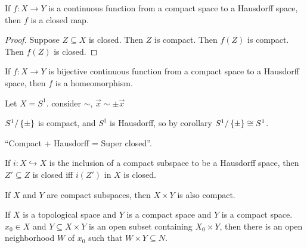 \documentclass[12pt, twosided]{article}
\begin{document}
\begin{cor}
  If \(f:X \to Y\) is a continuous function from a compact space to a Hausdorff space, then \(f\) is a closed map.
\end{cor}

\begin{proof}
  Suppose \(Z \subseteq X\) is closed. Then \(Z\) is compact. Then \(f(Z)\) is compact. Then \(f(Z)\) is closed.
\end{proof}
\begin{cor}
  If \(f:X \to Y\) is bijective continuous function from a compact space to a Hausdorff space, then \(f\) is a homeomorphism.
\end{cor}

\begin{exa}
  Let \(X = S^1\). consider \(\sim\), \(\vec{x} \sim \pm \vec{x}\)

  \begin{center}
  \end{center}

  \(S^1/\left\{ \pm \right\}\) is compact, and \(S^1\) is Hausdorff, so by corollary \(S^1/\left\{ \pm \right\} \cong S^1\).
\end{exa}
\begin{framed}
  ``Compact + Hausdorff = Super closed''.

  If \(i: X \hookrightarrow X\) is the inclusion of a compact subspace to be a Hausdorff space, then \(Z\prime \subseteq Z\) is closed iff \(i(Z\prime)\) in \(X\) is closed.
\end{framed}
\begin{thm}
  If \(X\) and \(Y\) are compact subspaces, then \(X \times Y\) is also compact.
\end{thm}

\begin{lm}
  If \(X\) is a topological space and \(Y\) is a compact space and \(Y\) is a compact space. \(x_0 \in X\) and \(Y \subseteq X \times Y\) is an open subset containing \(X_0 \times Y\), then there is an open neighborhood \(W\) of \(x_0\) such that \(W \times Y \subseteq N\).
\end{lm}
\end{document}
